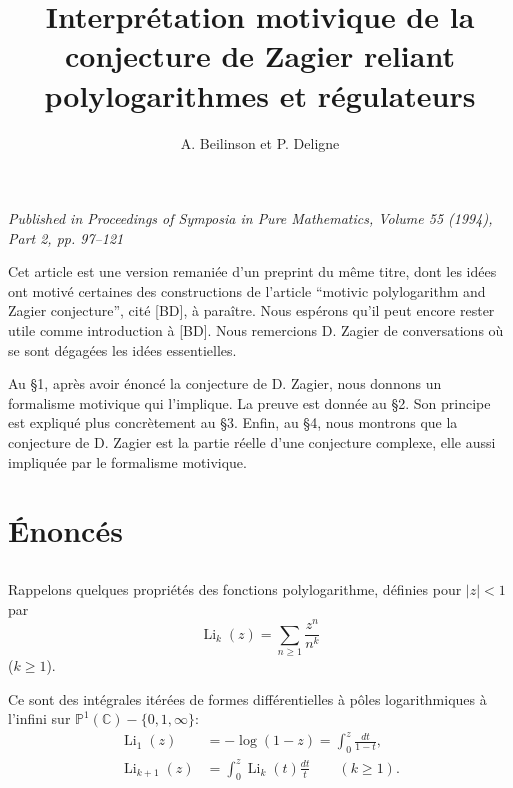 \documentclass[12pt,a4paper]{article}
\title{\textbf{Interpr{\'e}tation motivique de la conjecture de Zagier reliant polylogarithmes et r{\'e}gulateurs}}
\author{A. Beilinson et P. Deligne}
\date{}
\theoremstyle{plain}
\theoremstyle{definition}
\theoremstyle{remark}
\newcommand{\C}{\mathbb{C}}
\newcommand{\IP}{\mathbb{P}}
\begin{document}
\maketitle

\begin{center}
\textit{Published in Proceedings of Symposia in Pure Mathematics, Volume 55 (1994), Part 2, pp. 97--121}
\end{center}

\bigskip

Cet article est une version remani{\'e}e d'un preprint du m{\^e}me titre, dont les id{\'e}es ont motiv{\'e} certaines des constructions de l'article ``motivic polylogarithm and Zagier conjecture'', cit{\'e} [BD], {\`a} para{\^i}tre. Nous esp{\'e}rons qu'il peut encore rester utile comme introduction {\`a} [BD]. Nous remercions D. Zagier de conversations o{\`u} se sont d{\'e}gag{\'e}es les id{\'e}es essentielles.

\medskip

Au \S 1, apr{\`e}s avoir {\'e}nonc{\'e} la conjecture de D. Zagier, nous donnons un formalisme motivique qui l'implique. La preuve est donn{\'e}e au \S 2. Son principe est expliqu{\'e} plus concr{\`e}tement au \S 3. Enfin, au \S 4, nous montrons que la conjecture de D. Zagier est la partie r{\'e}elle d'une conjecture complexe, elle aussi impliqu{\'e}e par le formalisme motivique.

\section{{\'E}nonc{\'e}s}

\subsection{}

Rappelons quelques propri{\'e}t{\'e}s des fonctions polylogarithme, d{\'e}finies pour $|z|<1$ par
\begin{equation}\label{eq:1.1.1}
\operatorname{Li}_k(z) = \sum_{n\geq 1} \frac{z^n}{n^k}
\tag{1.1.1}
\end{equation}
($k\geq 1$).

Ce sont des int{\'e}grales it{\'e}r{\'e}es de formes diff{\'e}rentielles {\`a} p{\^o}les logarithmiques {\`a} l'infini sur $\IP^1(\C)-\{0,1,\infty\}$:
\begin{equation}\label{eq:1.1.2}
\begin{aligned}
\operatorname{Li}_1(z) &= -\log(1-z) = \int_0^z \frac{dt}{1-t},\\
\operatorname{Li}_{k+1}(z) &= \int_0^z \operatorname{Li}_k(t)\frac{dt}{t} \qquad (k\geq 1).
\end{aligned}
\tag{1.1.2}
\end{equation}
\end{document}
